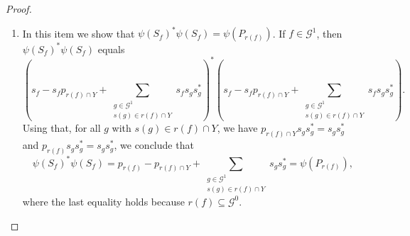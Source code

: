 \documentclass[10pt,a4paper]{amsart}
\begin{document}
\begin{proof}
\begin{enumerate}
Of course $\psi(P_{\emptyset}) = p_{\emptyset} = 0$. Let us now prove that
$\psi(P_{Z_1 \cap Z_2}) = \psi(P_{Z_1}) \psi(P_{Z_2})$ for all $Z_1, Z_2 \in \mathcal{E}_X^0$.
Write
\[
Z_1 = A_1 \cup (B_1 \cap Y)'
\quad\text{and}\quad
Z_2 = A_2 \cup (B_2 \cap Y)'
\]
as in Corollary~\ref{decomposition2}. Note that $\psi(P_{Z_1}) \psi(P_{Z_2})$ is the product of
\[
\left(
p_{A_1} - p_{A_1 \cap Y}
+ \sum_{\substack{e \in \mathcal{G}^1 \\ s(e) \in A_1 \cap Y}} s_e s_e^*
+ \sum_{\substack{w \in \mathcal{G}^0 \\ w \in B_1 \cap Y}} q_w
\right)
\]
and
\[
\left(
p_{A_2} - p_{A_2 \cap Y}
+ \sum_{\substack{e \in \mathcal{G}^1 \\ s(e) \in A_2 \cap Y}} s_e s_e^*
+ \sum_{\substack{w \in \mathcal{G}^0 \\ w \in B_2 \cap Y}} q_w
\right).
\]
Using the equalities provided in Lemma~\ref{contas1}, most of the products are $0$ or cancel with
another term, so that
\[
\psi(P_{Z_1})\psi(P_{Z_2})
=
p_{A_1 \cap A_2}
-
p_{A_1 \cap A_2 \cap Y}
+
\sum_{\substack{e \in \mathcal{G}^1 \\ s(e) \in A_1 \cap A_2 \cap Y}} s_e s_e^*
+
\sum_{w \in B_1 \cap B_2 \cap Y} q_w.
\]
Thus we have the desired result; indeed, the right-hand side is exactly the definition of
$\psi(P_{Z_1 \cap Z_2})$, because
$Z_1 \cap Z_2 = (A_1 \cap A_2) \cup (B_1 \cap B_2 \cap Y)'$.

To finalize item~(1), we still need to show that
$\psi(P_{Z_1}) + \psi(P_{Z_2}) - \psi(P_{Z_1 \cap Z_2}) = \psi(P_{Z_1 \cup Z_2})$.
This is similar to what we did above, and we leave it to the interested reader.

\item In this item we show that $\psi(S_f)^*\psi(S_f) = \psi(P_{r(f)})$. If $f \in \mathcal{G}^1$,
then $\psi(S_f)^* \psi(S_f)$ equals
\[
\left(
s_f - s_f p_{r(f) \cap Y}
+ \sum_{\substack{g \in \mathcal{G}^1 \\ s(g) \in r(f) \cap Y}} s_f s_g s_g^*
\right)^{\!*}
\left(
s_f - s_f p_{r(f) \cap Y}
+ \sum_{\substack{g \in \mathcal{G}^1 \\ s(g) \in r(f) \cap Y}} s_f s_g s_g^*
\right).
\]
Using that, for all $g$ with $s(g) \in r(f) \cap Y$, we have
$p_{r(f) \cap Y}s_g s_g^* = s_g s_g^*$ and $p_{r(f)}s_g s_g^* = s_g s_g^*$, we conclude that
\[
\psi(S_f)^* \psi(S_f)
=
p_{r(f)} - p_{r(f) \cap Y}
+ \sum_{\substack{g \in \mathcal{G}^1 \\ s(g) \in r(f) \cap Y}} s_g s_g^*
=
\psi(P_{r(f)}),
\]
where the last equality holds because $r(f) \subseteq \mathcal{G}^0$.


\end{enumerate}
\end{proof}
\end{document}
